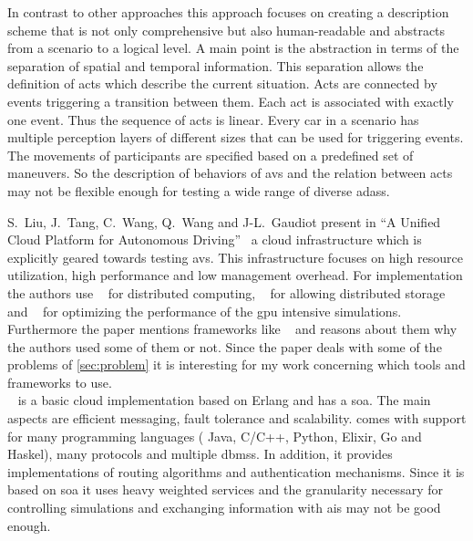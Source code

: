 In contrast to other approaches this approach focuses on creating a description scheme that is not only comprehensive but also human-readable and abstracts from a scenario to a logical level.
A main point is the abstraction in terms of the separation of spatial and temporal information.
This separation allows the definition of acts which describe the current situation.
Acts are connected by events triggering a transition between them.
Each act is associated with exactly one event.
Thus the sequence of acts is linear.
Every car in a scenario has multiple perception layers of different sizes that can be used for triggering events.
The movements of participants are specified based on a predefined set of maneuvers.
So the description of behaviors of \glspl{av} and the relation between acts may not be flexible enough for testing a wide range of diverse \glspl{adas}.\par

S.\ Liu, J.\ Tang, C.\ Wang, Q.\ Wang and J-L.\ Gaudiot present in ``A Unified Cloud Platform for Autonomous Driving''~\cite{unifiedCloud} a cloud infrastructure which is explicitly geared towards testing \glspl{av}.
This infrastructure focuses on high resource utilization, high performance and low management overhead.
For implementation the authors use \spark{}~\cite{spark} for distributed computing, \alluxio{}~\cite{alluxio} for allowing distributed storage and \opencl{}~\cite{openCL} for optimizing the performance of the \gls{gpu} intensive simulations.
Furthermore the paper mentions frameworks like \hadoop{}~\cite{hadoop} and reasons about them why the authors used some of them or not.
Since the paper deals with some of the problems of \autoref{sec:problem} it is interesting for my work concerning which tools and frameworks to use.\\
\cloudi{}~\cite{cloudI} is a basic cloud implementation based on Erlang and has a \gls{soa}.
The main aspects are efficient messaging, fault tolerance and scalability.
\cloudi{} comes with support for many programming languages (\eg{} Java, C/C++, Python, Elixir, Go and Haskel), many protocols and multiple \glspl{dbms}.
In addition, it provides implementations of routing algorithms and authentication mechanisms.
Since it is based on \gls{soa} it uses heavy weighted services and the granularity necessary for controlling simulations and exchanging information with \glspl{ai} may not be good enough.\par

